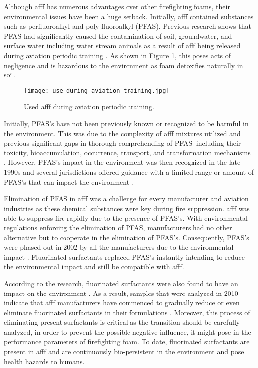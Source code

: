 Although \acrshort{afff} has numerous advantages over other firefighting foams, their environmental issues have been a huge setback. Initially, \acrshort{afff} contained substances such as perfluoroalkyl and poly-fluoroalkyl (PFAS). Previous research shows that PFAS had significantly caused the contamination of soil, groundwater, and surface water including water stream animals as a result of \acrshort{afff} being released during aviation periodic training \cite{milley2018estimating}. As shown in Figure \ref{ch2:figure:use}, this poses acts of negligence and is hazardous to the environment as foam detoxifies naturally in soil.

\begin{figure}[H]
    \centering
    \texttt{[image: use\_during\_aviation\_training.jpg]}
    \caption{Used \acrshort{afff} during aviation periodic training.}
    \label{ch2:figure:use}
\end{figure}

Initially, PFAS's have not been previously known or recognized to be harmful in the environment. This was due to the complexity of \acrshort{afff} mixtures utilized and previous significant gaps in thorough comprehending of PFAS, including their toxicity, bioaccumulation, occurrence, transport, and transformation mechanisms \cite{milley2018estimating}. However, PFAS's impact in the environment was then recognized in the late 1990s and several jurisdictions offered guidance with a limited range or amount of PFAS's that can impact the environment \cite{hinnant2017influence}.

Elimination of PFAS in \acrshort{afff} was a challenge for every manufacturer and aviation industries as these chemical substances were key during fire suppression. \acrshort{afff} was able to suppress fire rapidly due to the presence of PFAS's. With environmental regulations enforcing the elimination of PFAS, manufacturers had no other alternative but to cooperate in the elimination of PFAS's. Consequently, PFAS's were phased out in 2002 by all the manufacturers due to the environmental impact \cite{persson2003foamspex}.  Fluorinated surfactants replaced PFAS's instantly intending to reduce the environmental impact and still be compatible with \acrshort{afff}. 

According to the research, fluorinated surfactants were also found to have an impact on the environment \cite{martin2012fire}. As a result, samples that were analyzed in 2010 indicate that \acrshort{afff} manufacturers have commenced to gradually reduce or even eliminate fluorinated surfactants in their formulations \cite{milley2018estimating}. Moreover, this process of eliminating present surfactants is critical as the transition should be carefully analyzed, in order to prevent the possible negative influence, it might pose in the performance parameters of firefighting foam. To date, fluorinated surfactants are present in \acrshort{afff} and are continuously bio-persistent in the environment and pose health hazards to humans.


